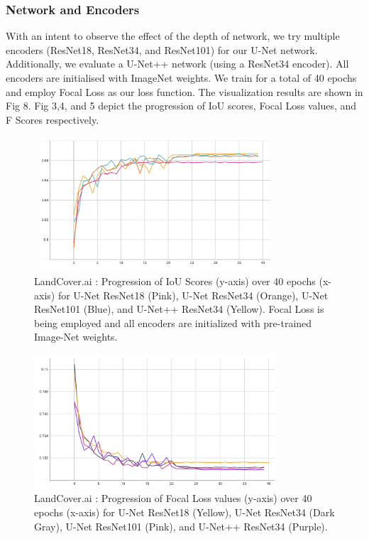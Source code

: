 \documentclass[conference]{IEEEtran}
\begin{document}
\subsubsection{Network and Encoders} With an intent to observe the effect of the depth of network, we try multiple encoders (ResNet18, ResNet34, and ResNet101) for our U-Net network. Additionally, we evaluate a U-Net++ network (using a ResNet34 encoder). All encoders are initialised with ImageNet weights. We train for a total of 40 epochs and employ Focal Loss as our loss function. The visualization results are shown in Fig 8. Fig 3,4, and 5 depict the progression of IoU scores, Focal Loss values, and F Scores respectively.

\begin{figure}[!h]
    \includegraphics[width=9cm, height=5cm]{images/encoders/encoders_iou.png}
    \caption{LandCover.ai : Progression of IoU Scores (y-axis) over 40 epochs (x-axis) for U-Net ResNet18 (Pink), U-Net ResNet34 (Orange), U-Net ResNet101 (Blue), and U-Net++ ResNet34 (Yellow). Focal Loss is being employed and all encoders are initialized with pre-trained Image-Net weights.}
\end{figure}



\begin{figure}[!h]
    \includegraphics[width=9cm, height=5cm]{images/encoders/encoders_focalloss.png}
    \caption{LandCover.ai : Progression of Focal Loss values (y-axis) over 40 epochs (x-axis) for U-Net ResNet18 (Yellow), U-Net ResNet34 (Dark Gray), U-Net ResNet101 (Pink), and U-Net++ ResNet34 (Purple).}
\end{figure}
\end{document}
